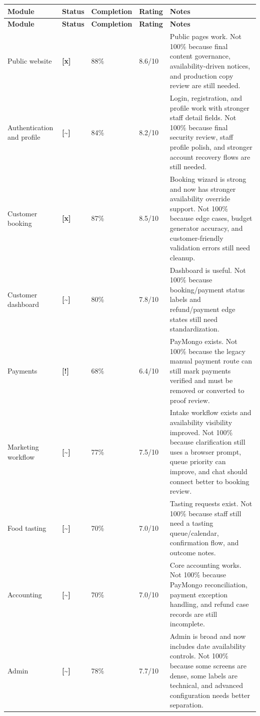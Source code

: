 \documentclass[11pt,a4paper]{article}
\newcommand{\statusdone}{\textbf{[x]}}
\newcommand{\statuspartial}{\textbf{[{\textasciitilde}]}}
\newcommand{\statusrisk}{\textbf{[!]}}
\begin{document}
\begin{longtable}{L{0.20\textwidth} C{0.10\textwidth} C{0.12\textwidth} C{0.13\textwidth} L{0.35\textwidth}}
\toprule
\textbf{Module} & \textbf{Status} & \textbf{Completion} & \textbf{Rating} & \textbf{Notes} \\
\midrule
\endfirsthead
\toprule
\textbf{Module} & \textbf{Status} & \textbf{Completion} & \textbf{Rating} & \textbf{Notes} \\
\midrule
\endhead
Public website & \statusdone & 88\% & 8.6/10 & Public pages work. Not 100\% because final content governance, availability-driven notices, and production copy review are still needed. \\
Authentication and profile & \statuspartial & 84\% & 8.2/10 & Login, registration, and profile work with stronger staff detail fields. Not 100\% because final security review, staff profile polish, and stronger account recovery flows are still needed. \\
Customer booking & \statusdone & 87\% & 8.5/10 & Booking wizard is strong and now has stronger availability override support. Not 100\% because edge cases, budget generator accuracy, and customer-friendly validation errors still need cleanup. \\
Customer dashboard & \statuspartial & 80\% & 7.8/10 & Dashboard is useful. Not 100\% because booking/payment status labels and refund/payment edge states still need standardization. \\
Payments & \statusrisk & 68\% & 6.4/10 & PayMongo exists. Not 100\% because the legacy manual payment route can still mark payments verified and must be removed or converted to proof review. \\
Marketing workflow & \statuspartial & 77\% & 7.5/10 & Intake workflow exists and availability visibility improved. Not 100\% because clarification still uses a browser prompt, queue priority can improve, and chat should connect better to booking review. \\
Food tasting & \statuspartial & 70\% & 7.0/10 & Tasting requests exist. Not 100\% because staff still need a tasting queue/calendar, confirmation flow, and outcome notes. \\
Accounting & \statuspartial & 70\% & 7.0/10 & Core accounting works. Not 100\% because PayMongo reconciliation, payment exception handling, and refund case records are still incomplete. \\
Admin & \statuspartial & 78\% & 7.7/10 & Admin is broad and now includes date availability controls. Not 100\% because some screens are dense, some labels are technical, and advanced configuration needs better separation. \\

\end{longtable}
\end{document}
